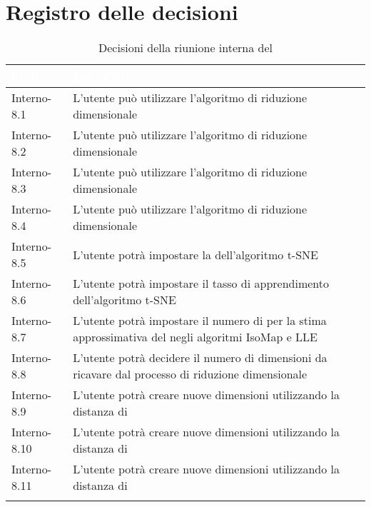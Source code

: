 \section{Registro delle decisioni}
{
\renewcommand{\arraystretch}{1.5}
\centering
\begin{longtable}{C{3cm} C{9cm}}
\textcolor{white}{\textbf{Codice}}&
\textcolor{white}{\textbf{Decisione}}\\	

\endhead
		
Interno-8.1 & L'utente può utilizzare l'algoritmo di riduzione dimensionale \textit{}\\
Interno-8.2 & L'utente può utilizzare l'algoritmo di riduzione dimensionale \textit{}\\
Interno-8.3 & L'utente può utilizzare l'algoritmo di riduzione dimensionale \textit{}\\
Interno-8.4 & L'utente può utilizzare l'algoritmo di riduzione dimensionale \textit{}\\
Interno-8.5 & L'utente potrà impostare la \textit{} dell'algoritmo t-SNE\\
Interno-8.6 & L'utente potrà impostare il tasso di apprendimento dell'algoritmo t-SNE\\
Interno-8.7 & L'utente potrà impostare il numero di \textit{} per la stima approssimativa del \textit{} negli algoritmi IsoMap e LLE\\
Interno-8.8 & L'utente potrà decidere il numero di dimensioni da ricavare dal processo di riduzione dimensionale\\
Interno-8.9 & L'utente potrà creare nuove dimensioni utilizzando la distanza di \textit{}\\
Interno-8.10 & L'utente potrà creare nuove dimensioni utilizzando la distanza di \textit{}\\
Interno-8.11 & L'utente potrà creare nuove dimensioni utilizzando la distanza di \textit{}\\
\caption{Decisioni della riunione interna del \Data{}}
\end{longtable}
}

